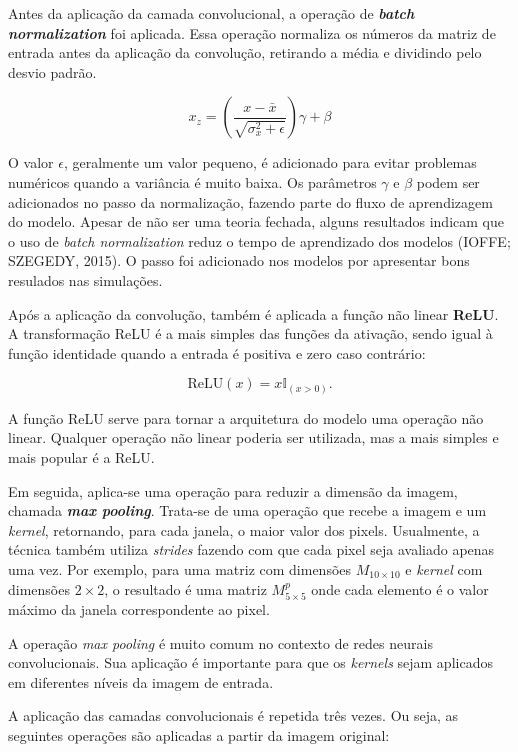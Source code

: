\documentclass[12pt,twoside,brazilian]{book}
\begin{document}
Antes da aplicação da camada convolucional, a operação de
\textbf{\emph{batch normalization}} foi aplicada. Essa operação
normaliza os números da matriz de entrada antes da aplicação da
convolução, retirando a média e dividindo pelo desvio padrão.

\[
x_z = \left(\frac{x-\bar x}{\sqrt{\sigma^2_x + \epsilon}}\right) \gamma + \beta
\]

O valor \(\epsilon\), geralmente um valor pequeno, é adicionado para
evitar problemas numéricos quando a variância é muito baixa. Os
parâmetros \(\gamma\) e \(\beta\) podem ser adicionados no passo da
normalização, fazendo parte do fluxo de aprendizagem do modelo. Apesar
de não ser uma teoria fechada, alguns resultados indicam que o uso de
\emph{batch normalization} reduz o tempo de aprendizado dos modelos
(IOFFE; SZEGEDY, 2015). O passo foi adicionado nos modelos por
apresentar bons resulados nas simulações.

Após a aplicação da convolução, também é aplicada a função não linear
\textbf{ReLU}. A transformação ReLU é a mais simples das funções da
ativação, sendo igual à função identidade quando a entrada é positiva e
zero caso contrário:

\[
\text{ReLU}(x) = x\mathbb I_{(x>0)}.
\]

A função ReLU serve para tornar a arquitetura do modelo uma operação não
linear. Qualquer operação não linear poderia ser utilizada, mas a mais
simples e mais popular é a ReLU.

Em seguida, aplica-se uma operação para reduzir a dimensão da imagem,
chamada \textbf{\emph{max pooling}}. Trata-se de uma operação que recebe
a imagem e um \emph{kernel}, retornando, para cada janela, o maior valor
dos pixels. Usualmente, a técnica também utiliza \emph{strides} fazendo
com que cada pixel seja avaliado apenas uma vez. Por exemplo, para uma
matriz com dimensões \(M_{10\times10}\) e \emph{kernel} com dimensões
\(2\times2\), o resultado é uma matriz \(M^p_{5\times5}\) onde cada
elemento é o valor máximo da janela correspondente ao pixel.

A operação \emph{max pooling} é muito comum no contexto de redes neurais
convolucionais. Sua aplicação é importante para que os \emph{kernels}
sejam aplicados em diferentes níveis da imagem de entrada.

A aplicação das camadas convolucionais é repetida três vezes. Ou seja,
as seguintes operações são aplicadas a partir da imagem original:
\end{document}
